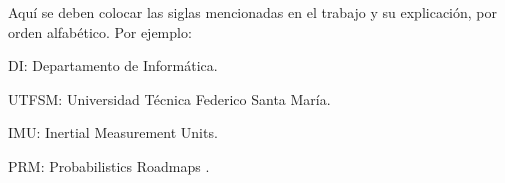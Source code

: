 
Aquí se deben colocar las siglas mencionadas en el trabajo y su explicación, por orden alfabético. Por ejemplo: \\

{\setlength{\parskip}{0cm} %
DI: Departamento de Informática.

UTFSM: Universidad Técnica Federico Santa María.

IMU: Inertial Measurement Units.

PRM: Probabilistics Roadmaps .
}
